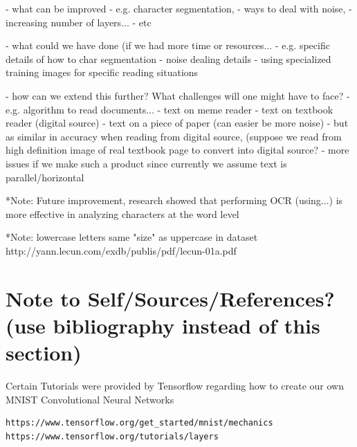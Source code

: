 \documentclass[11pt]{article}
\begin{document}
- what can be improved 
    - e.g. character segmentation, 
    - ways to deal with noise, 
    - increasing number of layers...
    - etc
    
- what could we have done (if we had more time or resources...
    - e.g. specific details of how to char segmentation
    - noise dealing details
    - using specialized training images for specific
        reading situations
    
- how can we extend this further? What challenges will one might have to face?
    - e.g. algorithm to read documents...
    - text on meme reader
    - text on textbook reader (digital source)
    - text on a piece of paper (can easier be more noise)
        - but as similar in accuracy when reading from digital source, (suppose we read from high definition image of real textbook page to convert into digital source?
            - more issues if we make such a product since currently we assume text is parallel/horizontal
    




*Note: Future improvement, research showed that performing OCR (using...) is more effective in analyzing characters at the word level

*Note: lowercase letters same "size" as uppercase in dataset
http://yann.lecun.com/exdb/publis/pdf/lecun-01a.pdf



\section{Note to Self/Sources/References?(use bibliography instead of this section)}
Certain Tutorials were provided by Tensorflow regarding how to create our own MNIST Convolutional Neural Networks
\begin{verbatim}
https://www.tensorflow.org/get_started/mnist/mechanics
https://www.tensorflow.org/tutorials/layers
\end{verbatim}

\clearpage


\end{document}
